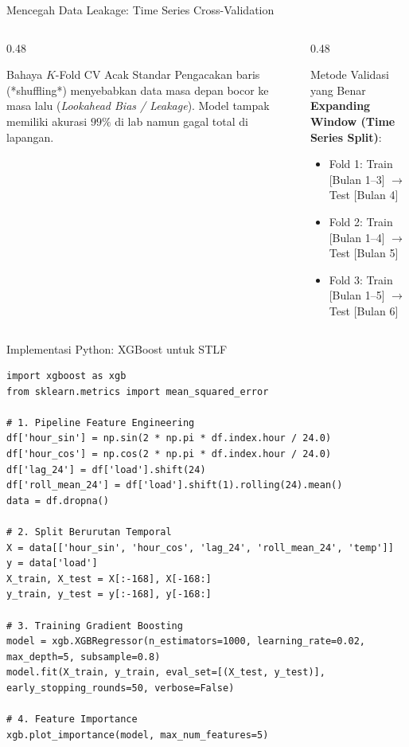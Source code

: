 \documentclass[aspectratio=169, 10pt]{beamer}
\begin{document}
\begin{frame}{Mencegah Data Leakage: Time Series Cross-Validation}
    \begin{columns}[T]
        \begin{column}{0.48\textwidth}
            \begin{block}{Bahaya $K$-Fold CV Acak Standar}
                Pengacakan baris (*shuffling*) menyebabkan data masa depan bocor ke masa lalu (\textit{Lookahead Bias / Leakage}). Model tampak memiliki akurasi $99\%$ di lab namun gagal total di lapangan.
            \end{block}
        \end{column}
        \begin{column}{0.48\textwidth}
            \begin{block}{Metode Validasi yang Benar}
                \textbf{Expanding Window (Time Series Split)}:
                \begin{itemize}
                    \item Fold 1: Train [Bulan 1--3] $\to$ Test [Bulan 4]
                    \item Fold 2: Train [Bulan 1--4] $\to$ Test [Bulan 5]
                    \item Fold 3: Train [Bulan 1--5] $\to$ Test [Bulan 6]
                \end{itemize}
            \end{block}
        \end{column}
    \end{columns}
\end{frame}

\begin{frame}[fragile]{Implementasi Python: XGBoost untuk STLF}
\begin{lstlisting}
import xgboost as xgb
from sklearn.metrics import mean_squared_error

# 1. Pipeline Feature Engineering
df['hour_sin'] = np.sin(2 * np.pi * df.index.hour / 24.0)
df['hour_cos'] = np.cos(2 * np.pi * df.index.hour / 24.0)
df['lag_24'] = df['load'].shift(24)
df['roll_mean_24'] = df['load'].shift(1).rolling(24).mean()
data = df.dropna()

# 2. Split Berurutan Temporal
X = data[['hour_sin', 'hour_cos', 'lag_24', 'roll_mean_24', 'temp']]
y = data['load']
X_train, X_test = X[:-168], X[-168:]
y_train, y_test = y[:-168], y[-168:]

# 3. Training Gradient Boosting
model = xgb.XGBRegressor(n_estimators=1000, learning_rate=0.02, max_depth=5, subsample=0.8)
model.fit(X_train, y_train, eval_set=[(X_test, y_test)], early_stopping_rounds=50, verbose=False)

# 4. Feature Importance
xgb.plot_importance(model, max_num_features=5)
\end{lstlisting}
\end{frame}
\end{document}

